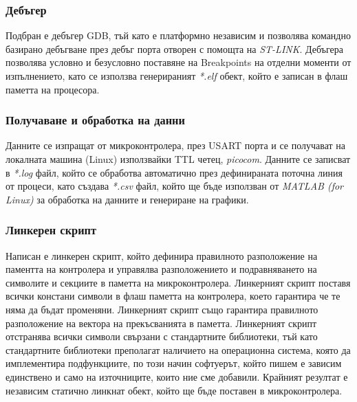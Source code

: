 \subsubsection{Дебъгер}

Подбран е дебъгер GDB, тъй като е платформно независим и позволява командно базирано дебъгване през дебъг порта отворен с помощта на \textit{ST-LINK}.
Дебъгера позволява условно и безусловно поставяне на Breakpoints на отделни моменти от изпълнението, като се използва генерираният \textit{*.elf} обект,
който е записан в флаш паметта на процесора.

\subsubsection{Получаване и обработка на данни}

Данните се изпращат от микроконтролера, през USART порта и се получават на локалната машина (Linux) използвайки TTL четец, \textit{picocom}.
Данните се записват в \textit{*.log} файл, който се обработва автоматично през дефинираната поточна линия от процеси, като създава \textit{*.csv} файл,
който ще бъде използван от \textit{MATLAB (for Linux)} за обработка на данните и генериране на графики.


\subsubsection{Линкерен скрипт}

Написан е линкерен скрипт, който дефинира правилното разположение на паментта на
контролера и управялва разположението и подравняването на символите и секциите в паметта на микроконтролера.
Линкерният скрипт поставя всички констани символи в флаш паметта на контролера, което гарантира че те няма да бъдат променяни.
Линкерният скрипт също гарантира правилното разположение на вектора на прекъсванията в паметта.
Линкерният скрипт отстранява всички символи свързани с стандартните библиотеки, 
тъй като стандартните библиотеки преполагат наличието на операционна система, 
която да имплементира подфункциите, по този начин софтуерът, който пишем е зависим единствено и само на източниците, които ние сме добавили.
Крайният резултат е независим статично линкнат обект, който ще бъде поставен в микроконтролера.
